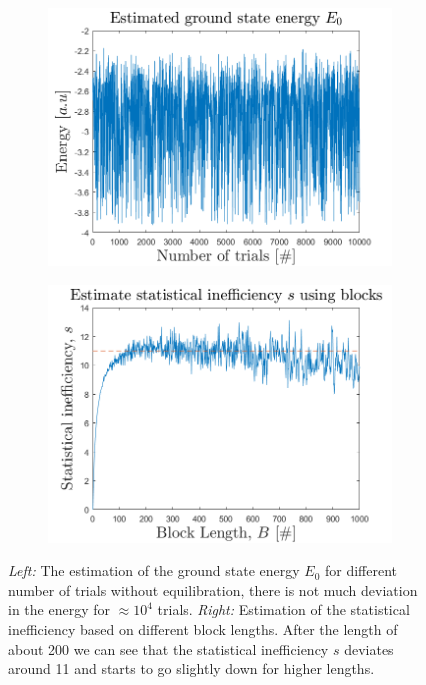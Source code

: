 \begin{figure}[H]
	\centering
	\captionsetup[subfigure]{justification=centering}
	\begin{subfigure}[b]{0.48\textwidth}
		\centering
		\includegraphics[width=\textwidth]{graphics/task2/local_energy.png}
	\end{subfigure}
	\begin{subfigure}[b]{0.48\textwidth}
		\centering
		\includegraphics[width=\textwidth]{graphics/task2/block_error.png}
	\end{subfigure}
	\caption{\textit{Left:} The estimation of the ground state energy $E_0$ for different number of trials without equilibration, there is not much deviation in the energy for $\approx10^4$ trials. \textit{Right:} Estimation of the statistical inefficiency based on different block lengths. After the length of about 200 we can see that the statistical inefficiency $s$ deviates around 11 and starts to go slightly down for higher lengths.}
	\label{fig:block_error}
\end{figure}

